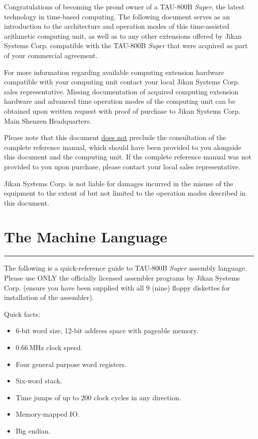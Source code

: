 \documentclass[a5paper,onecolumn,final,10pt]{memoir}
\makeatletter
\let\@copyright@old\copyright
\def\copyright{\makebox[.6ex][l]{\hspace{-.4ex}\textsuperscript{\@copyright@old}}}
\newcommand\machinename%
	{\textsf{TAU-800B \textit{Super}}}
\newcommand\companyname%
	{Jikan Systems Corp.\copyright}
\makeatother
\begin{document}
\noindent
Congratulations of becoming the proud owner of a \machinename{}, the latest technology in time-based computing. The following document serves as an introduction to the architecture and operation modes of this time-assisted arithmetic computing unit, as well as to any other extensions offered by \companyname{} compatible with the \machinename{} that were acquired as part of your commercial agreement.

For more information regarding available computing extension hardware compatible with your computing unit contact your local \companyname{} sales representative. Missing documentation of acquired computing extension hardware and advanced time operation modes of the computing unit can be obtained upon written request with proof of purchase to \companyname{} Main Shenzen Headquarters.

Please note that this document \underline{does not} preclude the consultation of the complete reference manual, which should have been provided to you alongside this document and the computing unit. If the complete reference manual was not provided to you upon purchase, please contact your local sales representative.

\companyname{} is not liable for damages incurred in the misuse of the equipment to the extent of but not limited to the operation modes described in this document.

\clearpage
\section{The Machine Language}
\vspace*{-20pt}\rule{\textwidth}{0.8pt}

\noindent
The following is a quick-reference guide to \machinename{} assembly language. Please use ONLY the officially licensed assembler programs by \companyname{} (ensure you have been supplied with all 9 (nine) floppy diskettes for installation of the assembler).


Quick facts:
\begin{itemize}[nosep]
	\item 6-bit word size, 12-bit address space with pageable memory.
	\item 0.66\,MHz clock speed.
	\item Four general purpose word registers.
	\item Six-word stack.
	\item Time jumps of up to 200 clock cycles in any direction.\footnotemark
	\item Memory-mapped IO.
	\item Big endian.
\end{itemize}
%
\end{document}
